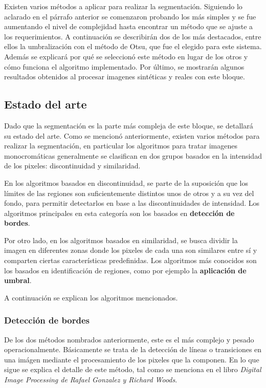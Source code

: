Existen varios métodos a aplicar para realizar la segmentación. Siguiendo lo aclarado en el párrafo anterior se comenzaron probando los más simples y se fue aumentando el nivel de complejidad hasta encontrar un método que se ajuste a los requerimientos. A continuación se describirán dos de los más destacados, entre ellos la umbralización con el método de Otsu\cite{otsu}, que fue el elegido para este sistema. Además se explicará por qué se seleccionó este método en lugar de los otros y cómo funciona el algoritmo implementado. Por último, se mostrarán algunos resultados obtenidos al procesar imagenes sintéticas y reales con este bloque.

\subsection{Estado del arte}%
\label{segEstArt}

Dado que la segmentación es la parte más compleja de este bloque, se detallará su estado del arte. Como se mencionó anteriormente, existen varios métodos para realizar la segmentación, en particular los algoritmos para tratar imagenes monocromáticas generalmente se clasifican en dos grupos basados en la intensidad de los pixeles: discontinuidad y similaridad. 

En los algoritmos basados en discontinuidad, se parte de la suposición que los límites de las regiones son suficientemente distintos unos de otros y a su vez del fondo, para permitir detectarlos en base a las discontinuidades de intensidad. Los algoritmos principales en esta categoría son los basados en \textbf{detección de bordes}.

Por otro lado, en los algoritmos basados en similaridad, se busca dividir la imagen en diferentes zonas donde los pixeles de cada una son similares entre sí y comparten ciertas características predefinidas. Los algoritmos más conocidos son los basados en identificación de regiones, como por ejemplo la \textbf{aplicación de umbral}.

A continuación se explican los algoritmos mencionados.

\subsubsection{Detección de bordes}
\label{detecbordeSec}

De los dos métodos nombrados anteriormente, este es el más complejo y pesado operacionalmente. Básicamente se trata de la detección de líneas o transiciones en una imágen mediante el procesamiento de los pixeles que la componen. En lo que sigue se explica el detalle de este método, tal como se menciona en el libro \textit{Digital Image Processing de Rafael Gonzalez y Richard Woods}\cite{Gonzalez}.

